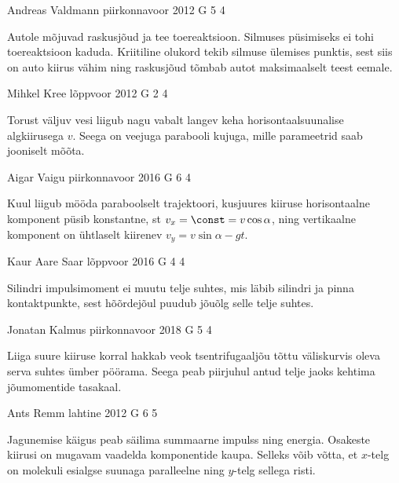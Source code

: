 \documentclass[11pt]{article}
\begin{document}
{%
{Andreas Valdmann} %
{piirkonnavoor} %
{2012} %
{G 5} %
{4} %
{

\ifHint
Autole mõjuvad raskusjõud ja tee toereaktsioon. Silmuses püsimiseks ei tohi toereaktsioon kaduda. Kriitiline olukord tekib silmuse ülemises punktis, sest siis on auto kiirus vähim ning raskusjõud tõmbab autot maksimaalselt teest eemale.
\fi
}

{Mihkel Kree} %
{lõppvoor} %
{2012} %
{G 2} %
{4} %
{

\ifHint
Torust väljuv vesi liigub nagu vabalt langev keha horisontaalsuunalise algkiirusega $v$. Seega on veejuga parabooli kujuga, mille parameetrid saab jooniselt mõõta.
\fi
}

{Aigar Vaigu} %
{piirkonnavoor} %
{2016} %
{G 6} %
{4} %
{

\ifHint
Kuul liigub mööda paraboolselt trajektoori, kusjuures kiiruse horisontaalne komponent püsib konstantne, st $v_x = \const = v\cos\alpha$, ning vertikaalne komponent on ühtlaselt kiirenev $v_y = v\sin\alpha - gt$.
\fi
}

{Kaur Aare Saar} %
{lõppvoor} %
{2016} %
{G 4} %
{4} %
{

\ifHint
Silindri impulsimoment ei muutu telje suhtes, mis läbib silindri ja pinna kontaktpunkte, sest hõõrdejõul puudub jõuõlg selle telje suhtes.
\fi
}

{Jonatan Kalmus} %
{piirkonnavoor} %
{2018} %
{G 5} %
{4} %
{

\ifHint
Liiga suure kiiruse korral hakkab veok tsentrifugaaljõu tõttu väliskurvis oleva serva suhtes ümber pöörama. Seega peab piirjuhul antud telje jaoks kehtima jõumomentide tasakaal.
\fi
}

{Ants Remm} %
{lahtine} %
{2012} %
{G 6} %
{5} %
{

\ifHint
Jagunemise käigus peab säilima summaarne impulss ning energia. Osakeste kiirusi on mugavam vaadelda komponentide kaupa. Selleks võib võtta, et $x$-telg on molekuli esialgse suunaga paralleelne ning $y$-telg sellega risti.
\fi
}

}
\end{document}
